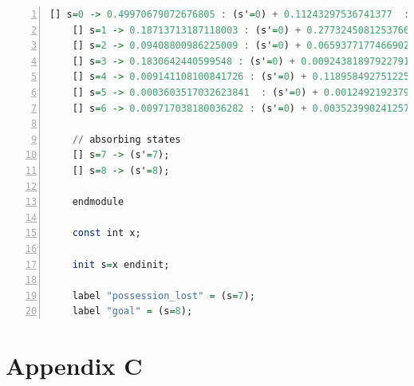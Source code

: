 \documentclass{l4proj}
\begin{document}
\begin{appendices}
\begin{lstlisting}[language=Haskell, numbers=left, caption=Initial DTMC specification in the PRISM modelling language.]
	[] s=0 -> 0.49970679072676805 : (s'=0) + 0.11243297536741377  : (s'=1) + 0.06151981643595859  : (s'=2) + 0.11160296757857256  : (s'=3) + 0.020193848920538784  : (s'=4) + 0.005906287309000472  : (s'=5) + 0.021971148207513978  : (s'=6) + 0.1666360927082613  : (s'=7) + 3.0072745972507496e-05  : (s'=8);
	[] s=1 -> 0.18713713187118003 : (s'=0) + 0.2773245081253766  : (s'=1) + 0.07777214511855685  : (s'=2) + 0.010569206783422127  : (s'=3) + 0.11936986484806167  : (s'=4) + 0.03541879884073497  : (s'=5) + 0.010435298281188724  : (s'=6) + 0.28146610680159545  : (s'=7) + 0.0005069393298835952  : (s'=8);
	[] s=2 -> 0.09408800986225009 : (s'=0) + 0.06593771774669024  : (s'=1) + 0.1368923192367476  : (s'=2) + 0.06804952564721016  : (s'=3) + 0.03657608404352254  : (s'=4) + 0.0302406603419628  : (s'=5) + 0.04112129495631667  : (s'=6) + 0.5228064533419092  : (s'=7) + 0.004287934823390685  : (s'=8);
	[] s=3 -> 0.1830642440599548 : (s'=0) + 0.009243818979227915  : (s'=1) + 0.0739601908525712  : (s'=2) + 0.2831365367005639  : (s'=3) + 0.009957106366571883  : (s'=4) + 0.03943322569762398  : (s'=5) + 0.12725432550966312  : (s'=6) + 0.27360354715889923  : (s'=7) + 0.00034700467492409273  : (s'=8);
	[] s=4 -> 0.009141108100841726 : (s'=0) + 0.11895849275122536  : (s'=1) + 0.02063987756705892  : (s'=2) + 0.0031228672471201374  : (s'=3) + 0.12661055156867207  : (s'=4) + 0.11244390213637209  : (s'=5) + 0.015924554836307985  : (s'=6) + 0.5892705726635369  : (s'=7) + 0.0038880731288648065  : (s'=8);
	[] s=5 -> 0.0003603517032623841  : (s'=0) + 0.0012492192379762648  : (s'=1) + 0.00838418296257147  : (s'=2) + 0.0015375006005861722  : (s'=3) + 0.004444337673569404  : (s'=4) + 0.021681160812953442  : (s'=5) + 0.00454043146110604  : (s'=6) + 0.916866862057368  : (s'=7) + 0.04093595349060683  : (s'=8);
	[] s=6 -> 0.009717038180036282 : (s'=0) + 0.0035239902412577935  : (s'=1) + 0.018495735763287946  : (s'=2) + 0.11841858331421899  : (s'=3) + 0.016910982755385034  : (s'=4) + 0.12436140709385492  : (s'=5) + 0.12888629397168297  : (s'=6) + 0.5760994223992326  : (s'=7) + 0.0035865462810434345  : (s'=8);

	// absorbing states
	[] s=7 -> (s'=7);
	[] s=8 -> (s'=8);

    endmodule

    const int x;

    init s=x endinit;

    label "possession_lost" = (s=7);
    label "goal" = (s=8);
    \end{lstlisting}

\chapter{Appendix C}\label{appendix3}


\end{appendices}
\end{document}

